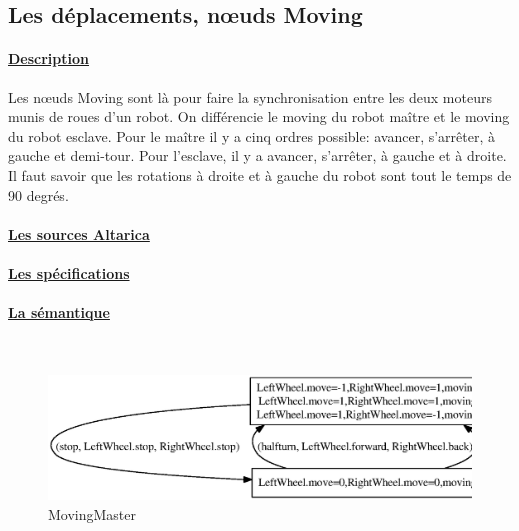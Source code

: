   \subsection{Les déplacements, n\oe{uds Moving}}

    \paragraph{\underline{Description}\\}
    Les n\oe{}uds Moving sont là pour faire la synchronisation entre les deux moteurs
    munis de roues d'un robot. On différencie le moving du robot maître
    et le moving du robot esclave. Pour le maître il y a cinq ordres
    possible: avancer, 
    s'arrêter, à gauche et demi-tour. Pour l'esclave, il y a avancer,
    s'arrêter, à gauche et à droite. Il faut savoir que les
    rotations à droite et à gauche du robot sont tout le temps de 90
    degrés.

    \paragraph{\underline{Les sources Altarica\\}}
    
    
    
    \paragraph{\underline{Les spécifications\\}}
    
    
    
    \paragraph{\underline{La sémantique\\}}
    ~\\
\begin{figure}[!ht]
     \begin{center}
      \includegraphics[width=16cm]{../src/altarica/MovingMaster.eps}
      \caption{MovingMaster}
     \end{center}
    \end{figure}

